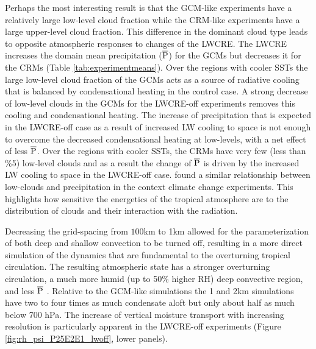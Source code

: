 \documentclass[draft]{agujournal2019}
\begin{document}
{Perhaps the most interesting result is that the GCM-like experiments have a relatively large low-level 
cloud fraction while the CRM-like experiments have a large upper-level cloud fraction.  
This difference in the dominant cloud type leads to opposite atmospheric responses to changes of the LWCRE.  
The LWCRE increases the domain mean precipitation ($\overline{\rm{P}}$) for the GCMs but 
decreases it for the CRMs (Table \ref{tab:experimentmeans}).  
Over the regions with cooler SSTs the large low-level cloud fraction of the GCMs 
acts as a source of radiative cooling that is balanced by condensational heating in the control case.  
A strong decrease of low-level clouds in the GCMs
for the LWCRE-off experiments removes this cooling and condensational heating.  The increase 
of precipitation that is expected in the LWCRE-off case as a result of increased LW cooling to space is not enough
to overcome the decreased condensational heating at low-levels, with a net effect of less $\overline{\rm{P}}$.  
Over the regions with cooler SSTs, the CRMs have very few (less than \%5) low-level clouds and as a result the 
change of $\overline{\rm{P}}$ is driven by the increased LW cooling to space in the LWCRE-off case.
 found a similar relationship between low-clouds and precipitation in the context climate 
change experiments.
This highlights how sensitive the energetics of the tropical atmosphere are to the distribution of clouds and 
their interaction with the radiation.      

Decreasing the grid-spacing from $100 \textrm{km}$ to 1km allowed for the parameterization of both deep and shallow 
convection to be turned off, resulting in a more direct simulation of the dynamics that are
fundamental to the overturning tropical circulation.  The resulting atmospheric state has a stronger overturning 
circulation, a much more humid (up to 50\% higher RH) deep convective region, and less $\overline{\rm{P}}$ .  
Relative to the GCM-like simulations the 1 and 2km simulations have two to four times as much condensate
aloft but only about half as much below 700 hPa.  The increase of vertical moisture transport with increasing 
resolution is particularly apparent in the LWCRE-off experiments (Figure \ref{fig:rh_psi_P25E2E1_lwoff}, lower panels).   

}
\end{document}
